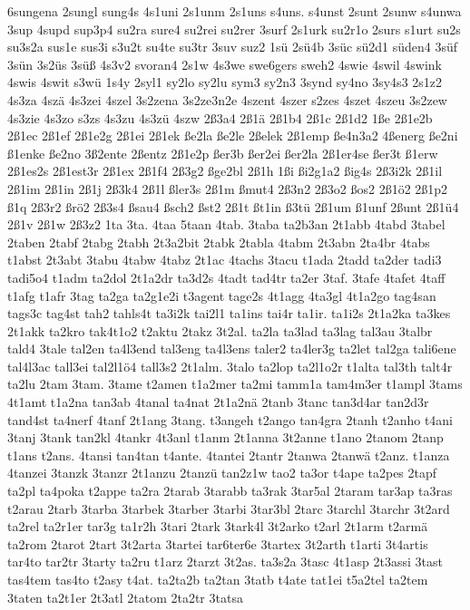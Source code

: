 {6sungena
2sungl
sung4s
4s1uni
2s1unm
2s1uns
s4uns.
s4unst
2sunt
2sunw
s4unwa
3sup
4supd
sup3p4
su2ra
sure4
su2rei
su2rer
3surf
2s1urk
su2r1o
2surs
s1urt
su2s
su3s2a
sus1e
sus3i
s3u2t
su4te
su3tr
3suv
suz2
1sü
2sü4b
3süc
sü2d1
süden4
3süf
3sün
3s2üs
3süß
4s3v2
svoran4
2s1w
4s3we
swe6gers
sweh2
4swie
4swil
4swink
4swis
4swit
s3wü
1s4y
2syl1
sy2lo
sy2lu
sym3
sy2n3
3synd
sy4no
3sy4s3
2s1z2
4s3za
4szä
4s3zei
4szel
3s2zena
3s2ze3n2e
4szent
4szer
s2zes
4szet
4szeu
3s2zew
4s3zie
4s3zo
s3zs
4s3zu
4s3zü
4szw
2ß3a4
2ß1ä
2ß1b4
2ß1c
2ß1d2
1ße
2ß1e2b
2ß1ec
2ß1ef
2ß1e2g
2ß1ei
2ß1ek
ße2la
ße2le
2ßelek
2ß1emp
ße4n3a2
4ßenerg
ße2ni
ß1enke
ße2no
3ß2ente
2ßentz
2ß1e2p
ßer3b
ßer2ei
ßer2la
2ß1er4se
ßer3t
ß1erw
2ß1es2s
2ß1est3r
2ß1ex
2ß1f4
2ß3g2
ßge2bl
2ß1h
1ßi
ßi2g1a2
ßig4s
2ß3i2k
2ß1il
2ß1im
2ß1in
2ß1j
2ß3k4
2ß1l
ßler3s
2ß1m
ßmut4
2ß3n2
2ß3o2
ßos2
2ß1ö2
2ß1p2
ß1q
2ß3r2
ßrö2
2ß3s4
ßsau4
ßsch2
ßst2
2ß1t
ßt1in
ß3tü
2ß1um
ß1unf
2ßunt
2ß1ü4
2ß1v
2ß1w
2ß3z2
1ta
3ta.
4taa
5taan
4tab.
3taba
ta2b3an
2t1abb
4tabd
3tabel
2taben
2tabf
2tabg
2tabh
2t3a2bit
2tabk
2tabla
4tabm
2t3abn
2ta4br
4tabs
t1abst
2t3abt
3tabu
4tabw
4tabz
2t1ac
4tachs
3tacu
t1ada
2tadd
ta2der
tadi3
tadi5o4
t1adm
ta2dol
2t1a2dr
ta3d2s
4tadt
tad4tr
ta2er
3taf.
3tafe
4tafet
4taff
t1afg
t1afr
3tag
ta2ga
ta2g1e2i
t3agent
tage2s
4t1agg
4ta3gl
4t1a2go
tag4san
tags3c
tag4st
tah2
tahls4t
ta3i2k
tai2l1
ta1ins
tai4r
ta1ir.
ta1i2s
2t1a2ka
ta3kes
2t1akk
ta2kro
tak4t1o2
t2aktu
2takz
3t2al.
ta2la
ta3lad
ta3lag
tal3au
3talbr
tald4
3tale
tal2en
ta4l3end
tal3eng
ta4l3ens
taler2
ta4ler3g
ta2let
tal2ga
tali6ene
tal4l3ac
tall3ei
tal2l1ö4
tall3s2
2t1alm.
3talo
ta2lop
ta2l1o2r
t1alta
tal3th
talt4r
ta2lu
2tam
3tam.
3tame
t2amen
t1a2mer
ta2mi
tamm1a
tam4m3er
t1ampl
3tams
4t1amt
t1a2na
tan3ab
4tanal
ta4nat
2t1a2nä
2tanb
3tanc
tan3d4ar
tan2d3r
tand4st
ta4nerf
4tanf
2t1ang
3tang.
t3angeh
t2ango
tan4gra
2tanh
t2anho
t4ani
3tanj
3tank
tan2kl
4tankr
4t3anl
t1anm
2t1anna
3t2anne
t1ano
2tanom
2tanp
t1ans
t2ans.
4tansi
tan4tan
t4ante.
4tantei
2tantr
2tanwa
2tanwä
t2anz.
t1anza
4tanzei
3tanzk
3tanzr
2t1anzu
2tanzü
tan2z1w
tao2
ta3or
t4ape
ta2pes
2tapf
ta2pl
ta4poka
t2appe
ta2ra
2tarab
3tarabb
ta3rak
3tar5al
2taram
tar3ap
ta3ras
t2arau
2tarb
3tarba
3tarbek
3tarber
3tarbi
3tar3bl
2tarc
3tarchl
3tarchr
3t2ard
ta2rel
ta2r1er
tar3g
ta1r2h
3tari
2tark
3tark4l
3t2arko
t2arl
2t1arm
t2armä
ta2rom
2tarot
2tart
3t2arta
3tartei
tar6ter6e
3tartex
3t2arth
t1arti
3t4artis
tar4to
tar2tr
3tarty
ta2ru
t1arz
2tarzt
3t2as.
ta3s2a
3tasc
4t1asp
2t3assi
3tast
tas4tem
tas4to
t2asy
t4at.
ta2ta2b
ta2tan
3tatb
t4ate
tat1ei
t5a2tel
ta2tem
3taten
ta2t1er
2t3atl
2tatom
2ta2tr
3tatsa
}
